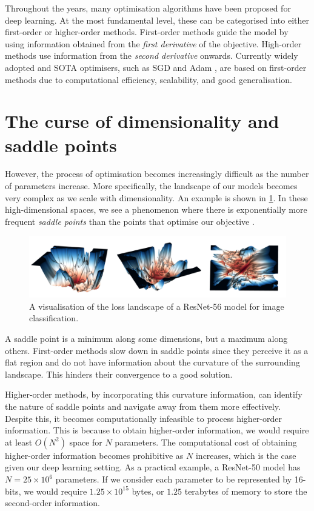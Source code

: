 Throughout the years, many optimisation algorithms have been proposed for deep learning. At the most fundamental level, these can be categorised into either first-order or higher-order methods. First-order methods guide the model by using information obtained from the \textit{first derivative} of the objective. High-order methods use information from the \textit{second derivative} onwards. Currently widely adopted and SOTA optimisers, such as SGD \citep{robbins1951stochastic} and Adam \citep{kingma2014adam}, are based on first-order methods due to computational efficiency, scalability, and good generalisation. 

\section{The curse of dimensionality and saddle points}
\label{sec:curse_of_dimensionality}

However, the process of optimisation becomes increasingly difficult as the number of parameters increase. More specifically, the landscape of our models becomes very complex as we scale with dimensionality. An example is shown in \cref{fig:high_dim_resnet}. In these high-dimensional spaces, we see a phenomenon where there is exponentially more frequent \textit{saddle points} than the points that optimise our objective \citep{dauphin2014sfn}. 

\begin{figure}[h]
  \centering
    \includegraphics[width=\textwidth]{figures/0intro/intro_landscape.png}
    \caption{A visualisation of the loss landscape of a ResNet-56 model for image classification.}
    \label{fig:high_dim_resnet}
\end{figure}

A saddle point is a minimum along some dimensions, but a maximum along others. First-order methods slow down in saddle points since they perceive it as a flat region and do not have information about the curvature of the surrounding landscape. This hinders their convergence to a good solution. 

Higher-order methods, by incorporating this curvature information, can identify the nature of saddle points and navigate away from them more effectively. Despite this, it becomes computationally infeasible to process higher-order information. This is because to obtain higher-order information, we would require at least $O(N^2)$ space for $N$ parameters. The computational cost of obtaining higher-order information becomes prohibitive as $N$ increases, which is the case given our deep learning setting. As a practical example, a ResNet-50 model has $N = 25 \times 10^6$ parameters. If we consider each parameter to be represented by 16-bits, we would require $1.25 \times 10^{15}$ bytes, or $1.25$ terabytes of memory to store the second-order information.

